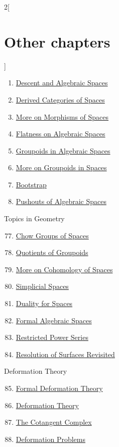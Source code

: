 \begin{multicols}{2}[\section{Other chapters}]
\begin{enumerate}
\item \hyperref[spaces-descent-section-phantom]{Descent and Algebraic Spaces}
\item \hyperref[spaces-perfect-section-phantom]{Derived Categories of Spaces}
\item \hyperref[spaces-more-morphisms-section-phantom]{More on Morphisms of Spaces}
\item \hyperref[spaces-flat-section-phantom]{Flatness on Algebraic Spaces}
\item \hyperref[spaces-groupoids-section-phantom]{Groupoids in Algebraic Spaces}
\item \hyperref[spaces-more-groupoids-section-phantom]{More on Groupoids in Spaces}
\item \hyperref[bootstrap-section-phantom]{Bootstrap}
\item \hyperref[spaces-pushouts-section-phantom]{Pushouts of Algebraic Spaces}
\end{enumerate}
Topics in Geometry
\begin{enumerate}
\setcounter{enumi}{76}
\item \hyperref[spaces-chow-section-phantom]{Chow Groups of Spaces}
\item \hyperref[groupoids-quotients-section-phantom]{Quotients of Groupoids}
\item \hyperref[spaces-more-cohomology-section-phantom]{More on Cohomology of Spaces}
\item \hyperref[spaces-simplicial-section-phantom]{Simplicial Spaces}
\item \hyperref[spaces-duality-section-phantom]{Duality for Spaces}
\item \hyperref[formal-spaces-section-phantom]{Formal Algebraic Spaces}
\item \hyperref[restricted-section-phantom]{Restricted Power Series}
\item \hyperref[spaces-resolve-section-phantom]{Resolution of Surfaces Revisited}
\end{enumerate}
Deformation Theory
\begin{enumerate}
\setcounter{enumi}{84}
\item \hyperref[formal-defos-section-phantom]{Formal Deformation Theory}
\item \hyperref[defos-section-phantom]{Deformation Theory}
\item \hyperref[cotangent-section-phantom]{The Cotangent Complex}
\item \hyperref[examples-defos-section-phantom]{Deformation Problems}
\end{enumerate}

\end{multicols}
